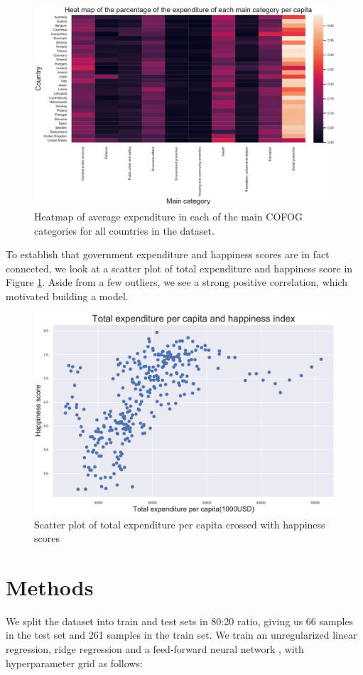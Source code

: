 \documentclass{article}
\begin{document}
\begin{figure}[h]
\centering
\includegraphics[width=0.85\linewidth]{figs/Heatmap_percentage.pdf}
\caption{Heatmap of average expenditure in each of the main COFOG categories for all countries in the dataset.}
\label{fig:scatter}
\end{figure}

To establish that government expenditure and happiness scores are in fact connected, we look at a scatter plot of total expenditure and happiness score in Figure \ref{fig:scatter}. Aside from a few outliers, we see a strong positive correlation, which motivated building a model.

\begin{figure}[h]
\centering
\includegraphics[width=0.5\linewidth]{figs/original_scatter_plot.pdf}
\caption{Scatter plot of total expenditure per capita crossed with happiness scores}
\label{fig:heatmap}
\end{figure}

\section{Methods}
We split the dataset into train and test sets in 80:20 ratio, giving us 66 samples in the test set and 261 samples in the train set. We train an unregularized linear regression, ridge regression and a feed-forward neural network \cite{neuralnetworks}, with hyperparameter grid as follows:
\end{document}

